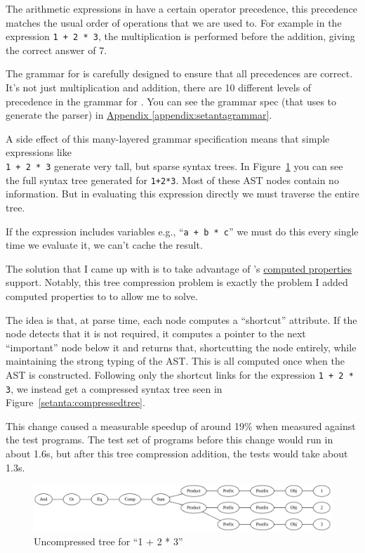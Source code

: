 The arithmetic expressions in \Setanta{} have a certain operator precedence, this precedence matches the usual order of operations that we are used to. For example in the expression \verb|1 + 2 * 3|, the multiplication is performed before the addition, giving the correct answer of 7.

The grammar for \Setanta{} is carefully designed to ensure that all precedences are correct.
It's not just multiplication and addition, there are 10 different levels of precedence in the grammar for \Setanta{}.
You can see the \Setanta{} grammar spec (that \tsPEG{} uses to generate the parser) in \hyperref[appendix:setantagrammar]{Appendix \ref*{appendix:setantagrammar}}.

A side effect of this many-layered grammar specification means that simple expressions like\\
\verb|1 + 2 * 3| generate very tall, but sparse syntax trees. In Figure~\ref{setanta:uncompressedtree} you can see the full syntax tree generated for \verb|1+2*3|.
Most of these AST nodes contain no information. But in evaluating this expression directly we must traverse the entire tree.

If the expression includes variables e.g., ``\verb|a + b * c|'' we must do this every single time we evaluate it, we can't cache the result.

The solution that I came up with is to take advantage of \tsPEG{}'s \hyperref[computed-properties]{computed properties} support. Notably, this tree compression problem is exactly the problem I added computed properties to \tsPEG{} to allow me to solve.

The idea is that, at parse time, each node computes a ``shortcut'' attribute. If the node detects that it is not required, it computes a pointer to the next ``important'' node below it and returns that, shortcutting the node entirely, while maintaining the strong typing of the AST. This is all computed once when the AST is constructed. Following only the shortcut links for the expression \verb|1 + 2 * 3|, we instead get a compressed syntax tree seen in Figure~\ref{setanta:compressedtree}.

This change caused a measurable speedup of around 19\% when measured against the test programs. The test set of programs before this change would run in about 1.6s, but after this tree compression addition, the tests would take about 1.3s.

\begin{figure}
    \caption{Uncompressed tree for ``1 + 2 * 3''}
    \label{setanta:uncompressedtree}
    \begin{center}
    \includegraphics[scale=0.3]{app2assets/tallgraph}
    \end{center}
\end{figure}

